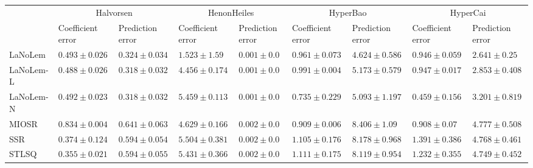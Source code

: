 \begin{table*}
{\begin{tabular}{lllllllll}
 & \multicolumn{2}{c}{Halvorsen} & \multicolumn{2}{c}{HenonHeiles} & \multicolumn{2}{c}{HyperBao} & \multicolumn{2}{c}{HyperCai} \\
 & Coefficient error & Prediction error & Coefficient error & Prediction error & Coefficient error & Prediction error & Coefficient error & Prediction error \\
\midrule
LaNoLem & $0.493\pm 0.026$ & $0.324\pm 0.034$ & $\mathbf{1.523}\pm 1.59$ & $0.001\pm 0.0$ & $0.961\pm 0.073$ & $\mathbf{4.624}\pm 0.586$ & $0.946\pm 0.059$ & $\mathbf{2.641}\pm 0.25$ \\
LaNoLem-L & $0.488\pm 0.026$ & $\mathbf{0.318}\pm 0.032$ & $4.456\pm 0.174$ & $0.001\pm 0.0$ & $0.991\pm 0.004$ & $5.173\pm 0.579$ & $0.947\pm 0.017$ & $2.853\pm 0.408$ \\
LaNoLem-N & $0.492\pm 0.023$ & $0.318\pm 0.032$ & $5.459\pm 0.113$ & $\mathbf{0.001}\pm 0.0$ & $\mathbf{0.735}\pm 0.229$ & $5.093\pm 1.197$ & $\mathbf{0.459}\pm 0.156$ & $3.201\pm 0.819$ \\
MIOSR & $0.834\pm 0.004$ & $0.641\pm 0.063$ & $4.629\pm 0.166$ & $0.002\pm 0.0$ & $0.909\pm 0.006$ & $8.406\pm 1.09$ & $0.908\pm 0.07$ & $4.777\pm 0.508$ \\
SSR & $0.374\pm 0.124$ & $0.594\pm 0.054$ & $5.504\pm 0.381$ & $0.002\pm 0.0$ & $1.105\pm 0.176$ & $8.178\pm 0.968$ & $1.391\pm 0.386$ & $4.768\pm 0.461$ \\
STLSQ & $\mathbf{0.355}\pm 0.021$ & $0.594\pm 0.055$ & $5.431\pm 0.366$ & $0.002\pm 0.0$ & $1.111\pm 0.175$ & $8.119\pm 0.954$ & $1.232\pm 0.355$ & $4.749\pm 0.452$ \\

\midrule


\end{tabular}}
\end{table*}
